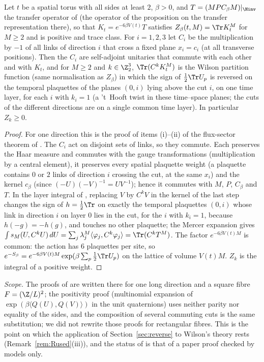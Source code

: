 \begin{proposition}\label{prop:wilsonC}
Let $t$ be a spatial torus with all sides at least $2$, $\beta>0$, and $T=(MPC_\beta M)|_{\Hinv}$ the transfer operator of \cite{TBv12} (the operator of the proposition on the transfer representation there), so that $K_t=e^{-6\beta V(t)}T$ satisfies $Z_\beta(t,M)=\Tr K_t^M$ for $M\ge2$ and is positive and trace class. For $i=1,2,3$ let $C_i$ be the multiplication by $-1$ of all links of direction $i$ that cross a fixed plane $x_i=c_i$ (at all transverse positions). Then the $C_i$ are self-adjoint unitaries that commute with each other and with $K_t$, and for $M\ge2$ and $k\in\Z_2^3$, $\Tr(C^kK_t^M)$ is the Wilson partition function (same normalisation as $Z_\beta$) in which the sign of $\frac12\Tr U_p$ is reversed on the temporal plaquettes of the planes $(0,i)$ lying above the cut $i$, on one time layer, for each $i$ with $k_i=1$ (a 't~Hooft twist in these time--space planes; the cuts of the different directions are on a single common time layer). In particular $Z_k\ge0$.
\end{proposition}
\begin{proof}
For one direction this is the proof of items (i)--(ii) of the flux-sector theorem of \cite{TBv12}. The $C_i$ act on disjoint sets of links, so they commute. Each preserves the Haar measure and commutes with the gauge transformations (multiplication by a central element), it preserves every spatial plaquette weight (a plaquette contains $0$ or $2$ links of direction $i$ crossing the cut, at the same $x_i$) and the kernel $c_\beta$ (since $(-U)(-V)^{-1}=UV^{-1}$); hence it commutes with $M$, $P$, $C_\beta$ and $T$. In the layer integral of \cite{TBv12}, replacing $V$ by $C^kV$ in the kernel of the last step changes the sign of $h=\frac12\Tr$ on exactly the temporal plaquettes $(0,i)$ whose link in direction $i$ on layer $0$ lies in the cut, for the $i$ with $k_i=1$, because $h(-g)=-h(g)$, and touches no other plaquette; the Mercer expansion gives $\int s_M(U,C^kU)\,dU=\sum_j\lambda_j^M\langle\varphi_j,C^k\varphi_j\rangle=\Tr(C^kT^M)$. The factor $e^{-6\beta V(t)M}$ is common: the action has $6$ plaquettes per site, so $e^{-S_\beta}=e^{-6\beta V(t)M}\exp(\beta\sum_p\frac12\Tr U_p)$ on the lattice of volume $V(t)M$. $Z_k$ is the integral of a positive weight.
\end{proof}
\emph{Scope.} The proofs of \cite{TBv12} are written there for one long direction and a square fibre $F=(\Z/L)^2$; the positivity proof (multinomial expansion of $\exp(\beta\langle Q(U),Q(V)\rangle)$ in the unit quaternions) uses neither parity nor equality of the sides, and the composition of several commuting cuts is the same substitution; we did not rewrite those proofs for rectangular fibres. This is the point on which the application of Section~\ref{sec:reverse} to Wilson's theory rests (Remark~\ref{rem:Rused}(iii)), and the status of \cite{TBv12} is that of a paper proof checked by models only.

